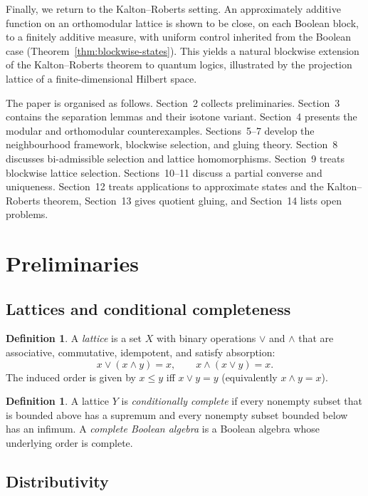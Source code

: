 \documentclass[11pt]{amsart}
\theoremstyle{definition}
\newtheorem{definition}[theorem]{Definition}
\newcommand{\join}{\vee}
\newcommand{\meet}{\wedge}
\begin{document}
Finally, we return to the Kalton--Roberts setting.
An approximately additive function on an orthomodular lattice is shown to be close, on each
Boolean block, to a finitely additive measure, with uniform control inherited from the
Boolean case (Theorem~\ref{thm:blockwise-states}).
This yields a natural blockwise extension of the Kalton--Roberts theorem to quantum logics,
illustrated by the projection lattice of a finite-dimensional Hilbert space.

The paper is organised as follows.
Section~2 collects preliminaries.
Section~3 contains the separation lemmas and their isotone variant.
Section~4 presents the modular and orthomodular counterexamples.
Sections~5--7 develop the neighbourhood framework, blockwise selection, and gluing theory.
Section~8 discusses bi-admissible selection and lattice homomorphisms.
Section~9 treats blockwise lattice selection.
Sections~10--11 discuss a partial converse and uniqueness.
Section~12 treats applications to approximate states and the Kalton--Roberts theorem,
Section~13 gives quotient gluing, and Section~14 lists open problems.

\section{Preliminaries}

\subsection{Lattices and conditional completeness}

\begin{definition}
A \emph{lattice} is a set $X$ with binary operations $\join$ and $\meet$ that are associative, commutative, idempotent, and satisfy absorption:
\[
x\join(x\meet y)=x,\qquad x\meet(x\join y)=x.
\]
The induced order is given by $x\le y$ iff $x\join y=y$ (equivalently $x\meet y=x$).
\end{definition}

\begin{definition}
A lattice $Y$ is \emph{conditionally complete} if every nonempty subset that is bounded above has a supremum and every nonempty subset bounded below has an infimum.
A \emph{complete Boolean algebra} is a Boolean algebra whose underlying order is complete.
\end{definition}

\subsection{Distributivity}
\end{document}
